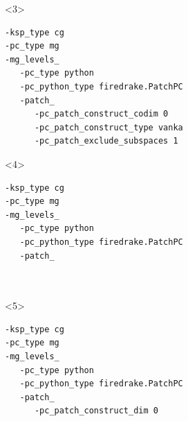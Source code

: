 \documentclass[presentation,aspectratio=43, 10pt]{beamer}
\begin{document}
\begin{frame}[fragile, t]
\begin{overlayarea}{\textwidth}{0.52\textheight}
\begin{onlyenv}
\begin{columns}[T]
\begin{column}{0.6\textwidth}
\begin{onlyenv}
\begin{verbatim}
\end{verbatim}
        \end{onlyenv}
        \begin{onlyenv}<3>
\begin{verbatim}
-ksp_type cg
-pc_type mg
-mg_levels_
   -pc_type python
   -pc_python_type firedrake.PatchPC
   -patch_
      -pc_patch_construct_codim 0
      -pc_patch_construct_type vanka
      -pc_patch_exclude_subspaces 1
\end{verbatim}
        \end{onlyenv}
        \begin{onlyenv}<4>
\begin{verbatim}
-ksp_type cg
-pc_type mg
-mg_levels_
   -pc_type python
   -pc_python_type firedrake.PatchPC
   -patch_



\end{verbatim}
        \end{onlyenv}
        \begin{onlyenv}<5>
\begin{verbatim}
-ksp_type cg
-pc_type mg
-mg_levels_
   -pc_type python
   -pc_python_type firedrake.PatchPC
   -patch_
      -pc_patch_construct_dim 0



\end{verbatim}
\end{onlyenv}
\end{column}
\end{columns}
\end{onlyenv}
\end{overlayarea}
\end{frame}
\end{document}
